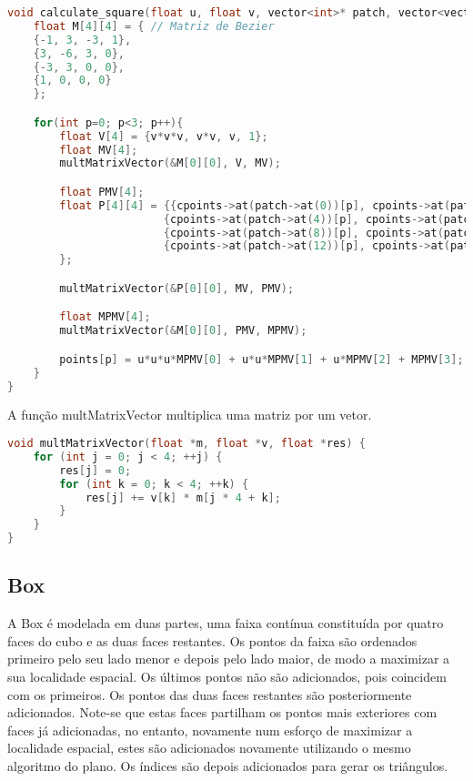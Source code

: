 \documentclass[14pt, a4 paper]{report}
\begin{document}
\begin{lstlisting}[language=c++]
void calculate_square(float u, float v, vector<int>* patch, vector<vector<float>>* cpoints, float* points){
    float M[4][4] = { // Matriz de Bezier
    {-1, 3, -3, 1},
    {3, -6, 3, 0},
    {-3, 3, 0, 0},
    {1, 0, 0, 0}
    }; 

    for(int p=0; p<3; p++){
        float V[4] = {v*v*v, v*v, v, 1};
        float MV[4];
        multMatrixVector(&M[0][0], V, MV);

        float PMV[4];
        float P[4][4] = {{cpoints->at(patch->at(0))[p], cpoints->at(patch->at(1))[p], cpoints->at(patch->at(2))[p], cpoints->at(patch->at(3))[p]},
                        {cpoints->at(patch->at(4))[p], cpoints->at(patch->at(5))[p], cpoints->at(patch->at(6))[p], cpoints->at(patch->at(7))[p]},
                        {cpoints->at(patch->at(8))[p], cpoints->at(patch->at(9))[p], cpoints->at(patch->at(10))[p], cpoints->at(patch->at(11))[p]},
                        {cpoints->at(patch->at(12))[p], cpoints->at(patch->at(13))[p], cpoints->at(patch->at(14))[p], cpoints->at(patch->at(15))[p]}
        };

        multMatrixVector(&P[0][0], MV, PMV);

        float MPMV[4];
        multMatrixVector(&M[0][0], PMV, MPMV);

        points[p] = u*u*u*MPMV[0] + u*u*MPMV[1] + u*MPMV[2] + MPMV[3];
    }
}
\end{lstlisting}

A função multMatrixVector multiplica uma matriz por um vetor.

\begin{lstlisting}[language=c++]
void multMatrixVector(float *m, float *v, float *res) {
	for (int j = 0; j < 4; ++j) {
		res[j] = 0;
		for (int k = 0; k < 4; ++k) {
			res[j] += v[k] * m[j * 4 + k];
		}
	}
}

\end{lstlisting}

\subsection{Box}
A Box é modelada em duas partes, uma faixa contínua constituída por quatro faces do cubo e as duas faces restantes.
Os pontos da faixa são ordenados primeiro pelo seu lado menor e depois pelo lado maior, de modo a maximizar a sua localidade espacial. Os últimos pontos não são adicionados, pois coincidem com os primeiros.
Os pontos das duas faces restantes são posteriormente adicionados. Note-se que estas faces partilham os pontos mais exteriores com faces já adicionadas, no entanto, novamente num esforço de maximizar a localidade espacial, estes são adicionados novamente utilizando o mesmo algoritmo do plano.
Os índices são depois adicionados para gerar os triângulos. 
\end{document}
